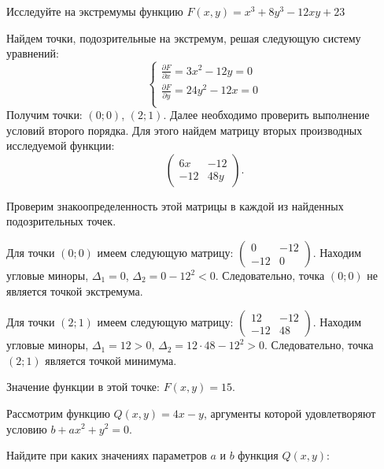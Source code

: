 \documentclass[addpoints]{exam} %
\begin{document}
\begin{questions}
\begin{parts}
\begin{solution}
\end{solution}
\end{parts}

\question[10] 
Исследуйте на экстремумы функцию $F(x,y)= x^3+8y^3-12xy+23$

\begin{solution}
Найдем точки, подозрительные на экстремум, решая следующую систему уравнений:
\[
\begin{cases}
\frac{\partial F}{\partial x}=3x^2-12y=0 \\
\frac{\partial F}{\partial y}=24y^2-12x=0 \\
\end{cases}
\]
Получим точки:  $(0;0)$, $(2;1)$.
Далее необходимо проверить выполнение условий второго порядка. Для этого найдем матрицу вторых производных исследуемой функции:
\[
\begin{pmatrix}
6x & -12 \\
-12 & 48y 
\end{pmatrix}.
\]



Проверим знакоопределенность этой матрицы в каждой из найденных подозрительных точек.


Для точки  $(0;0)$ имеем следующую матрицу:  
$\begin{pmatrix}
0 & -12 \\
-12 & 0
\end{pmatrix}$. 
Находим угловые миноры, $\Delta_1=0$, $\Delta_2=0-12^2<0$. Следовательно, точка $(0;0)$  не является точкой экстремума.


Для точки $(2;1)$  имеем следующую матрицу:
$\begin{pmatrix}
12 & -12 \\
-12 & 48
\end{pmatrix}.$  
Находим угловые миноры, $\Delta_1=12>0$, $\Delta_2=12\cdot 48-12^2>0$.  Следовательно, точка $(2;1)$  является точкой минимума.

Значение функции в этой точке: $F(x,y)=15$.
\end{solution}



\question Рассмотрим функцию $Q(x,y)=4x-y$, аргументы которой удовлетворяют условию $b+ax^2+y^2=0$.

Найдите при каких значениях параметров $a$ и $b$  функция $Q(x,y)$:


\end{questions}
\end{document}
